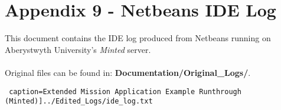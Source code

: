 \documentclass{article}
\begin{document}
\section*{Appendix 9 - Netbeans IDE Log}

This document contains the IDE log produced from Netbeans running on Aberystwyth University's \textit{Minted} server.\\\\
Original files can be found in: \textbf{Documentation/Original\_Logs/}.

\texttt{ caption=Extended Mission Application Example Runthrough (Minted)]{../Edited_Logs/ide_log.txt}}
\end{document}
